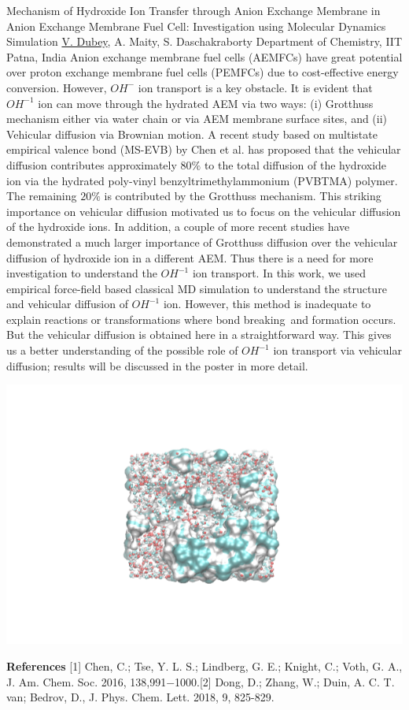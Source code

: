 
    \begin{abstract_online}{Mechanism of Hydroxide Ion Transfer through Anion Exchange Membrane in Anion Exchange Membrane Fuel Cell: Investigation using Molecular Dynamics Simulation}{%
        \underline{V. Dubey}, A. Maity, S. Daschakraborty}{%
        }{%
        Department of Chemistry, IIT Patna, India}
    Anion exchange membrane fuel cells (AEMFCs) have great potential over proton exchange  membrane fuel cells (PEMFCs) due to cost-effective energy conversion. However, $OH^{-}$ ion  transport is a key obstacle. It is evident that $OH^{-1}$ ion can move through the hydrated AEM via  two ways: (i) Grotthuss mechanism either via water chain or via AEM membrane surface sites,  and (ii) Vehicular diffusion via Brownian motion. A recent study based on multistate empirical  valence bond (MS-EVB) by Chen et al. has proposed that the vehicular diffusion contributes  approximately $80 \%$ to the total diffusion of the hydroxide ion via the hydrated poly-vinyl  benzyltrimethylammonium (PVBTMA) polymer. The remaining $20 \%$ is contributed by the  Grotthuss mechanism. This striking importance on vehicular diffusion motivated us to focus on  the vehicular diffusion of the hydroxide ions. In addition, a couple of more recent studies have  demonstrated a much larger importance of Grotthuss diffusion over the vehicular diffusion of  hydroxide ion in a different AEM. Thus there is a need for more investigation to understand the  $OH^{-1}$ ion transport. In this work, we used empirical force-field based classical MD simulation to  understand the structure and vehicular diffusion of $OH^{-1}$ ion. However, this method is inadequate  to explain reactions or transformations where bond breaking and formation occurs. But the  vehicular diffusion is obtained here in a straightforward way. This gives us a better  understanding of the possible role of $OH^{-1}$ ion transport via vehicular diffusion; results will be  discussed in the poster in more detail.  \begin{center}  \includegraphics[width=0.65\linewidth]{abstracts/txt/figures/vikas-dubey.png}  \end{center}  
    
        \textbf{References} \newline{}[1] Chen, C.; Tse, Y. L. S.; Lindberg, G. E.; Knight, C.; Voth, G. A., J. Am. Chem. Soc. 2016, 138,\newline{}991−1000.\newline{}[2] Dong, D.; Zhang, W.; Duin, A. C. T. van; Bedrov, D., J. Phys. Chem. Lett. 2018, 9, 825-829.
    \end{abstract_online}
    